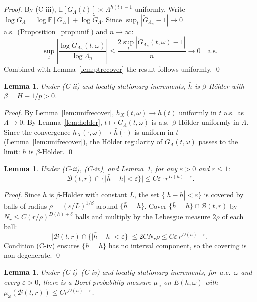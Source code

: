 \documentclass[10pt,a4paper]{amsart}
\newtheorem{lemma}[theorem]{Lemma}
\newcommand{\E}{\mathbb{E}}
\newcommand{\GL}{G_\Lambda}
\newcommand{\hb}{\bar{h}}
\begin{document}
\begin{proof}
By (C-iii), $\E[\GL(t)]\asymp\Lambda^{\hb(t)-1}$ uniformly. Write
$\log\GL=\log\E[\GL]+\log\tilde G_\Lambda$. Since
$\sup_t|\tilde G_{\Lambda_n}-1|\to0$ a.s.\ (Proposition~\ref{prop:unif})
and $n\to\infty$:
\[
  \sup_t\left|\frac{\log\tilde G_{\Lambda_n}(t,\omega)}{\log\Lambda_n}\right|
  \le\frac{2\sup_t|\tilde G_{\Lambda_n}(t,\omega)-1|}{n}\to0\quad\text{a.s.}
\]
Combined with Lemma~\ref{lem:ptrecover} the result follows uniformly. \qed
\end{proof}

\begin{lemma}\label{lem:hbarholder}
Under (C-ii) and locally stationary increments, $\hb$ is
$\beta$-H\"{o}lder with $\beta=H-1/p>0$.
\end{lemma}

\begin{proof}
By Lemma~\ref{lem:unifrecover}, $h_X(t,\omega)\to\hb(t)$ uniformly
in $t$ a.s.\ as $\Lambda\to0$. By Lemma~\ref{lem:holder},
$t\mapsto\GL(t,\omega)$ is a.s.\ $\beta$-H\"{o}lder uniformly in
$\Lambda$. Since the convergence $h_X(\cdot,\omega)\to\hb(\cdot)$
is uniform in $t$ (Lemma~\ref{lem:unifrecover}), the H\"{o}lder
regularity of $\GL(t,\omega)$ passes to the limit: $\hb$ is
$\beta$-H\"{o}lder. \qed
\end{proof}

\begin{lemma}\label{lem:ballbound}
Under (C-ii), (C-iv), and Lemma~\ref{lem:hbarholder}, for any
$\varepsilon>0$ and $r\le1$:
\[
  |\mathcal{B}(t,r)\cap\{|\hb-h|<\varepsilon\}|
  \le C\varepsilon\cdot r^{\bar D(h)-\varepsilon}.
\]
\end{lemma}

\begin{proof}
Since $\hb$ is $\beta$-H\"{o}lder with constant $L$, the set
$\{|\hb-h|<\varepsilon\}$ is covered by balls of radius
$\rho=(\varepsilon/L)^{1/\beta}$ around $\{\hb=h\}$. Cover
$\{\hb=h\}\cap\mathcal{B}(t,r)$ by
$N_r\le C(r/\rho)^{\bar D(h)+\delta}$ balls and multiply by the
Lebesgue measure $2\rho$ of each ball:
\[
  |\mathcal{B}(t,r)\cap\{|\hb-h|<\varepsilon\}|
  \le 2CN_r\rho
  \le C\varepsilon\,r^{\bar D(h)-\varepsilon}.
\]
Condition (C-iv) ensures $\{\hb=h\}$ has no interval component,
so the covering is non-degenerate. \qed
\end{proof}

\begin{lemma}\label{lem:frostman}
Under (C-i)--(C-iv) and locally stationary increments, for a.e.\
$\omega$ and every $\varepsilon>0$, there is a Borel probability
measure $\mu_\omega$ on $E(h,\omega)$ with
$\mu_\omega(\mathcal{B}(t,r))\le Cr^{\bar D(h)-\varepsilon}$.
\end{lemma}
\end{document}
